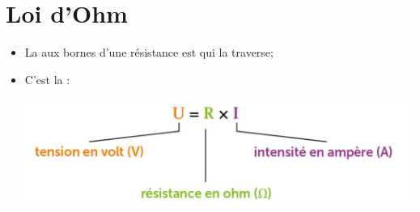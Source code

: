 \documentclass[12pt,a4paper]{article}
\begin{document}
\section{Loi d'Ohm}


	\begin{mybilan}
		\begin{itemize}
			\item La  aux bornes d'une résistance est  qui la traverse;
			
			\item C'est la  :
			
			\begin{center}
				\includegraphics[scale=0.5]{img/loi}
			\end{center}
		\end{itemize}
	\end{mybilan}
%
\end{document}
